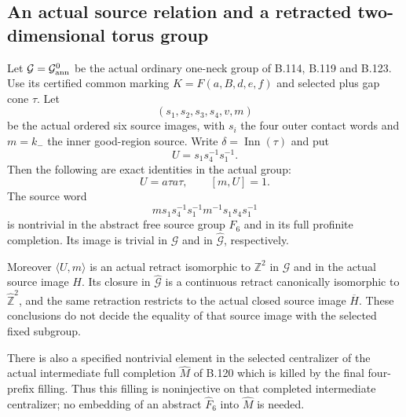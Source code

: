 \subsection*{An actual source relation and a retracted two-dimensional torus group}

\label{stmt:B130}
Let $\mathcal G=\mathcal G^0_{\rm ann}$ be the actual ordinary
one-neck group of B.114, B.119 and B.123. Use its certified common
marking $K=F(a,B,d,e,f)$ and selected plus gap cone $\tau$.
Let
\[
 (s_1,s_2,s_3,s_4,v,m)
\]
be the actual ordered six source images, with $s_i$ the four
outer contact words and $m=k_-$ the inner good-region source.
Write $\delta=\operatorname{Inn}(\tau)$ and put
\begin{equation}\label{eq:B130-U}
 U=s_1s_4^{-1}s_1^{-1}.
\end{equation}
Then the following are exact identities in the actual group:
\begin{equation}\label{eq:B130-actual-relation}
 U=a\tau a\tau,\qquad [m,U]=1.
\end{equation}
The source word
\begin{equation}\label{eq:B130-source-word}
 m s_1s_4^{-1}s_1^{-1}m^{-1}s_1s_4s_1^{-1}
\end{equation}
is nontrivial in the abstract free source group $F_6$ and in its
full profinite completion. Its image is trivial in $\mathcal G$
and in $\widehat{\mathcal G}$, respectively.

Moreover $\langle U,m\rangle$ is an actual retract isomorphic to
$\mathbb Z^2$ in $\mathcal G$ and in the actual source image $H$.
Its closure in $\widehat{\mathcal G}$ is a continuous retract
canonically isomorphic to $\widehat{\mathbb Z}^2$, and the
same retraction restricts to the actual closed source image
$\overline H$. These conclusions do not decide the equality
of that source image with the selected fixed subgroup.

There is also a specified nontrivial element in the selected
centralizer of the actual intermediate full completion
$\widehat M$ of B.120 which is killed by the final four-prefix
filling. Thus this filling is noninjective on that completed
intermediate centralizer; no embedding of an abstract
$\widehat F_6$ into $\widehat M$ is needed.

